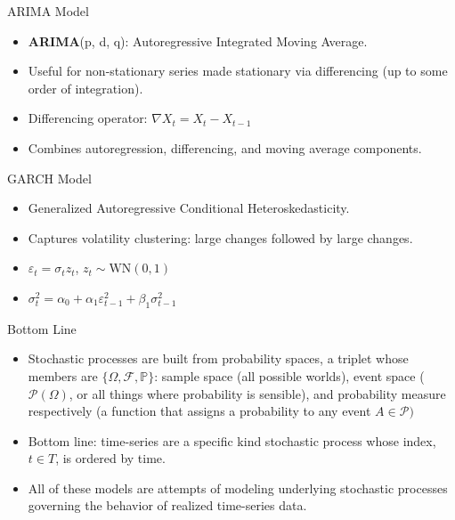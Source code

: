 \documentclass{beamer}
\begin{document}
	\begin{frame}{ARIMA Model}
		\begin{itemize}
			\item \textbf{ARIMA}(p, d, q): Autoregressive Integrated Moving Average.
			\item Useful for non-stationary series made stationary via differencing (up to some order of integration).
			\item Differencing operator: \( \nabla X_t = X_t - X_{t-1} \)
			\item Combines autoregression, differencing, and moving average components.
		\end{itemize}
	\end{frame}
	
	\begin{frame}{GARCH Model}
		\begin{itemize}
			\item Generalized Autoregressive Conditional Heteroskedasticity.
			\item Captures volatility clustering: large changes followed by large changes.
			\item \( \varepsilon_t = \sigma_t z_t \), \quad \( z_t \sim \text{WN}(0,1) \)
			\item \( \sigma_t^2 = \alpha_0 + \alpha_1 \varepsilon_{t-1}^2 + \beta_1 \sigma_{t-1}^2 \)
		\end{itemize}
	\end{frame}
	
	\begin{frame}{Bottom Line}
		\begin{itemize}
			\item Stochastic processes are built from probability spaces, a triplet whose members are $\{\Omega, \mathcal{F}, \mathbb{P}\}$: sample space (all possible worlds), event space ($\mathcal{P}(\Omega)$, or all things where probability is sensible), and probability measure respectively (a function that assigns a probability to any event $A \in \mathcal{P})$
			\item Bottom line: time-series are a specific kind stochastic process whose index, $t \in T$, is ordered by time.
			\item All of these models are attempts of modeling underlying stochastic processes governing the behavior of realized time-series data.
			
			
		
	    \end{itemize}
	\end{frame}
\end{document}
